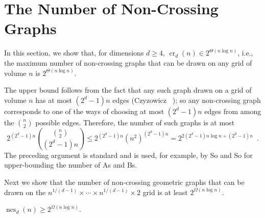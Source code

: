 \documentclass{patmorin}
\DeclareMathOperator{\crs}{cr}
\DeclareMathOperator{\ncs}{ncs}
\begin{document}
\section{The Number of Non-Crossing Graphs}

In this section, we show that, for dimensions $d\ge 4$, $\crs_d(n)\in
2^{\Theta(n\log n)}$, i.e., the maximum number of non-crossing graphs
that can be drawn on any grid of volume $n$ is $2^{\Theta(n\log n)}$.

The upper bound follows from the fact that any such graph drawn on
a grid of volume $n$ has at most $(2^d-1)n$ edges (Czyzowicz \etal\
\cite[Lemma Y]{X}); so any non-crossing graph corresponds to one of the
ways of choosing at most $(2^d-1)n$ edges from among the $\binom{n}{2}$
possible edges.  Therefore, the number of such graphs is at most
\[
    2^{(2^d-1)n}\binom{\binom{n}{2}}{(2^d-1)n} \le 2^{(2^d-1)n} (n^{2})^{(2^d-1)n} = 2^{2(2^d-1)n\log n+(2^d-1)n} \enspace .
\]
The preceding argument is standard and is used, for example, by
So and So for upper-bounding the number of As and Bs.

Next we show that the number of non-crossing geometric graphs that can
be drawn on the $n^{1/(d-1)}\times \cdots\times n^{1/(d-1)}\times 2$
grid is at least $2^{\Omega(n\log n)}$.

\begin{thm}
  $\ncs_d(n) \ge 2^{\Omega(n\log n)}$.
\end{thm}
\end{document}

